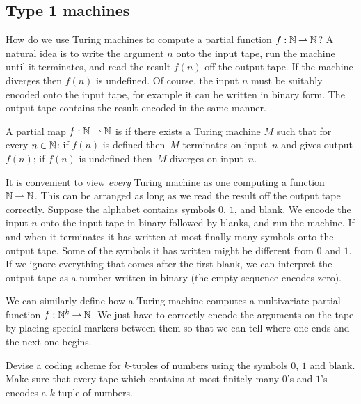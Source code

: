 \subsection{Type 1 machines}
\label{sec:type-1}

How do we use Turing machines to compute a partial function $f :
\mathbb{N} \mathbin{\rightharpoonup} \mathbb{N}$? A natural idea is to write the argument $n$ onto the
input tape, run the machine until it terminates, and read the result
$f(n)$ off the output tape. If the machine diverges then $f(n)$ is
undefined. Of course, the input $n$ must be suitably encoded onto the
input tape, for example it can be written in binary form. The output
tape contains the result encoded in the same manner.

\begin{definition}
  A partial map $f : \mathbb{N} \mathbin{\rightharpoonup} \mathbb{N}$ is  if there exists a Turing machine $M$ such that for every $n \in \mathbb{N}$: if $f(n)$ is defined then~$M$ terminates on input~$n$ and gives output $f(n)$; if $f(n)$ is undefined then~$M$ diverges on input~$n$.
\end{definition}

It is convenient to view \emph{every} Turing machine as one computing a
function $\mathbb{N} \mathbin{\rightharpoonup} \mathbb{N}$. This can be arranged as long as we read the
result off the output tape correctly. Suppose the alphabet contains
symbols $0$, $1$, and blank. We encode the input $n$ onto the input
tape in binary followed by blanks, and run the machine. If and when it
terminates it has written at most finally many symbols onto the output
tape. Some of the symbols it has written might be different from $0$
and $1$. If we ignore everything that comes after the first blank, we
can interpret the output tape as a number written in binary (the empty
sequence encodes zero).

We can similarly define how a Turing machine computes a multivariate
partial function $f : \mathbb{N}^k \mathbin{\rightharpoonup} \mathbb{N}$. We just have to correctly
encode the arguments on the tape by placing special markers between
them so that we can tell where one ends and the next one begins.

\begin{exercise}
  Devise a coding scheme for $k$-tuples of numbers using the symbols $0$, $1$ and blank. Make sure that every tape which contains at most finitely many $0$'s and $1$'s encodes a $k$-tuple of numbers.
\end{exercise}

